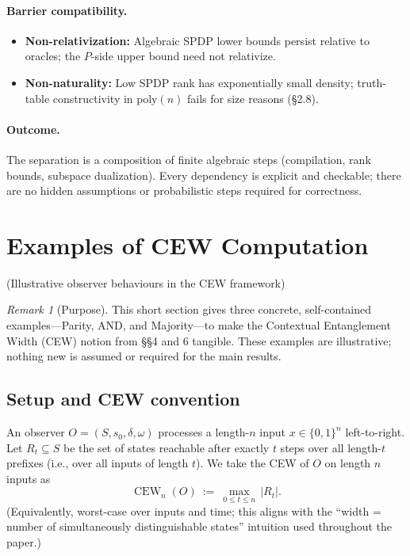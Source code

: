 \documentclass[12pt]{article}
\theoremstyle{definition}
\theoremstyle{definition}
\theoremstyle{remark}
\newtheorem{remark}{Remark}
\theoremstyle{remark}
\begin{document}
\paragraph{Barrier compatibility.}
\begin{itemize}
\item \textbf{Non-relativization:} Algebraic SPDP lower bounds persist relative to oracles; the $P$-side upper bound need not relativize.
\item \textbf{Non-naturality:} Low SPDP rank has exponentially small density; truth-table constructivity in $\mathrm{poly}(n)$ fails for size reasons (\S2.8).
\end{itemize}

\paragraph{Outcome.}
The separation is a composition of finite algebraic steps (compilation, rank bounds, subspace dualization). Every dependency is explicit and checkable; there are no hidden assumptions or probabilistic steps required for correctness.



\section{Examples of CEW Computation}
\label{sec:cew-examples}

(Illustrative observer behaviours in the CEW framework)

\begin{remark}[Purpose]
This short section gives three concrete, self-contained examples---Parity, AND, and Majority---to make the Contextual Entanglement Width (CEW) notion from \S\S4 and 6 tangible. These examples are illustrative; nothing new is assumed or required for the main results.
\end{remark}

\subsection{Setup and CEW convention}

An observer $O=(S,s_0,\delta,\omega)$ processes a length-$n$ input $x\in\{0,1\}^n$ left-to-right.
Let $R_t\subseteq S$ be the set of states reachable after exactly $t$ steps over all length-$t$ prefixes (i.e., over all inputs of length $t$). We take the CEW of $O$ on length $n$ inputs as
\[
\operatorname{CEW}_n(O) \ :=\ \max_{0\le t\le n}\,|R_t|.
\]
(Equivalently, worst-case over inputs and time; this aligns with the ``width = number of simultaneously distinguishable states'' intuition used throughout the paper.)
\end{document}
